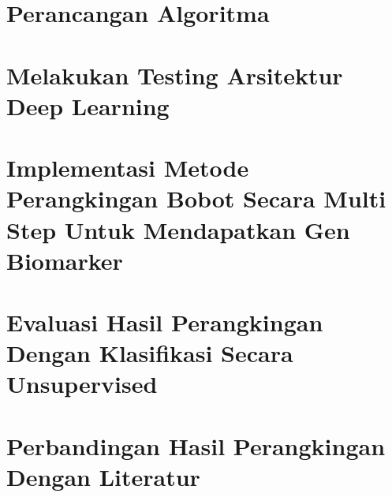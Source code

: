 \section{Perancangan Algoritma}



\section{Melakukan Testing Arsitektur Deep Learning}


\section{Implementasi Metode Perangkingan Bobot Secara Multi Step Untuk Mendapatkan Gen Biomarker}



\section{Evaluasi Hasil Perangkingan Dengan Klasifikasi Secara Unsupervised}



\section{Perbandingan Hasil Perangkingan Dengan Literatur}



